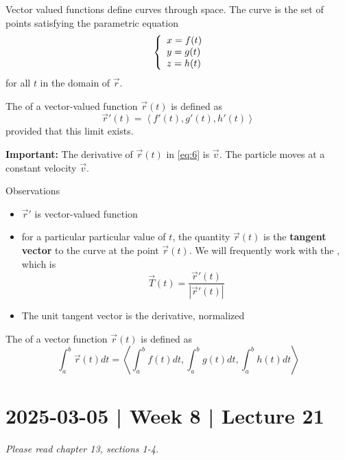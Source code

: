 \documentclass[10pt]{article}
\theoremstyle{definition}
\newcommand{\1}[1]{\textbf{1}_{\left[#1\right]}} %
\newcommand{\dempfcolor}[1]{{\color{RoyalBlue}#1}}
\newcommand{\demph}[1]{\dempfcolor{{\sl #1}}}
\begin{document}
Vector valued functions define curves through space. The curve is the set of points satisfying the
parametric equation
\begin{equation*}
  \left\{ \begin{array}{l@{}l}
      x = f(t) \\
      y = g(t) \\
      z = h(t) 
    \end{array}\right.
\end{equation*}
for all $t$ in the domain of $\vec{r}$.


The \demph{derivative} of a vector-valued function $\vec{r}(t)$ is defined as
\begin{equation*}
  \vec{r}'(t)  = \left\langle f'(t),g'(t),h'(t) \right\rangle 
\end{equation*}
provided that this limit exists.



\textbf{Important:} The derivative of $\vec{r}(t)$ in \cref{eq:6} is $\vec{v}$. The particle moves at a
constant velocity $\vec{v}$.


Observations
\begin{itemize}
  \item $\vec{r}'$ is vector-valued function
  \item for a particular particular value of $t$, the quantity $\vec{r}(t)$ is the \textbf{tangent
    vector} to the curve at the point $\vec{r}(t)$. We will frequently work with the \demph{unit tangent
    vector}, which is 
  \begin{equation*}
    \vec{T}(t) = \frac{\vec{r}'(t)}{|\vec{r}'(t)|}
  \end{equation*}
  \item The unit tangent vector is the derivative, normalized
\end{itemize}



The \demph{definite integral} of a vector function $\vec{r}(t)$ is defined as
\begin{equation*}
  \int_{a}^{b}\vec{r}(t)dt = \left\langle \int_{a}^{b}f(t)dt , \int_{a}^{b}g(t)dt, \int_{a}^{b}h(t)dt    \right\rangle  
\end{equation*}

\newpage
\section{2025-03-05 | Week 8 | Lecture 21}
\textit{Please read chapter 13, sections 1-4.}
\end{document}
